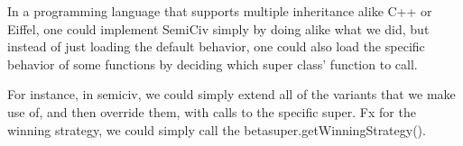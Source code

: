 In a programming language that supports multiple inheritance alike C++ or
Eiffel, one could implement SemiCiv simply by doing alike what we did, but
instead of just loading the default behavior, one could also load the specific
behavior of some functions by deciding which super class' function to
call.

For instance, in semiciv, we could simply extend all of the variants that we
make use of, and then override them, with calls to the specific super.
Fx for the winning strategy, we could simply call the
betasuper.getWinningStrategy().
